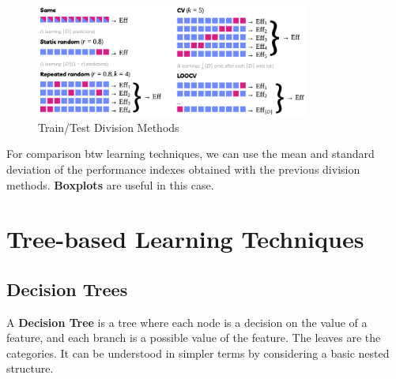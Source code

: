 

\begin{center}
    \begin{figure}[H]
        \centering
        \includegraphics[width=0.8\textwidth]{assets/fig10.png}
        \caption{Train/Test Division Methods}
    \end{figure}
\end{center}

For comparison btw learning techniques, we can use the mean and standard deviation of the performance indexes obtained with the previous division methods. \textbf{Boxplots} are useful in this case.

\section{Tree-based Learning Techniques}

\subsection{Decision Trees}

A \textbf{Decision Tree} is a tree where each node is a decision on the value of a feature, and each branch is a possible value of the feature. The leaves are the categories. It can be understood in simpler terms by considering a basic  nested structure.

